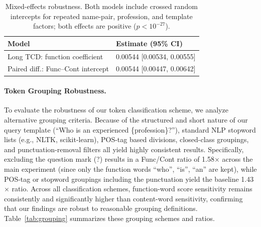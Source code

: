 \documentclass[11pt]{article}
\begin{document}
\begin{table}[t]
\centering
\scriptsize
\begin{tabular}{@{}p{}p{}@{}}
\toprule
\textbf{Model} & \textbf{Estimate (95\% CI)} \\
\midrule
Long TCD: function coefficient & 0.00544 [0.00534, 0.00555] \\
Paired diff.: Func--Cont intercept & 0.00544 [0.00447, 0.00642] \\
\bottomrule
\end{tabular}
\caption{Mixed-effects robustness. Both models include crossed random intercepts for repeated name-pair, profession, and template factors; both effects are positive ($p<10^{-27}$).}
\label{tab:mixed_effects}
\end{table}

\paragraph{Token Grouping Robustness.} To evaluate the robustness of our token classification scheme, we analyze alternative grouping criteria. Because of the structured and short nature of our query template (``Who is an experienced \{profession\}?''), standard NLP stopword lists (e.g., NLTK, scikit-learn), POS-tag based divisions, closed-class groupings, and punctuation-removal filters all yield highly consistent results. Specifically, excluding the question mark (?) results in a Func/Cont ratio of 1.58$\times$ across the main experiment (since only the function words ``who'', ``is'', ``an'' are kept), while POS-tag or stopword groupings including the punctuation yield the baseline 1.43$\times$ ratio. Across all classification schemes, function-word score sensitivity remains consistently and significantly higher than content-word sensitivity, confirming that our findings are robust to reasonable grouping definitions. Table~\ref{tab:grouping} summarizes these grouping schemes and ratios.
\end{document}
